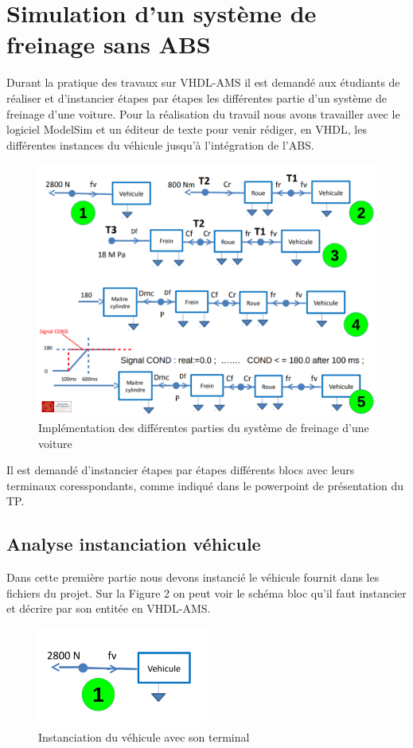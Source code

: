 \section{Simulation d'un système de freinage sans ABS}
Durant la pratique des travaux sur VHDL-AMS il est demandé aux étudiants de réaliser et d'instancier étapes par étapes les différentes partie d'un système de freinage d'une voiture. Pour la réalisation du travail nous avons travailler avec le logiciel ModelSim et un éditeur de texte pour venir rédiger, en VHDL, les différentes instances du véhicule jusqu'à l'intégration de l'ABS.

\begin{figure}[h]
    \centering
    \includegraphics[width=\textwidth]{images/etapes.png}
    \caption{Implémentation des différentes parties du système de freinage d'une voiture}
\end{figure}

Il est demandé d'instancier étapes par étapes différents blocs avec leurs terminaux coresspondants, comme indiqué dans le powerpoint de présentation du TP.

\newpage

\subsection{Analyse instanciation véhicule }
Dans cette première partie nous devons instancié le véhicule fournit dans les fichiers du projet. Sur la Figure 2 on peut voir le schéma bloc qu'il faut instancier et décrire par son entitée en VHDL-AMS.

\begin{figure}[h]
    \centering
    \includegraphics[width=0.5\textwidth]{images/un.png}
    \caption{Instanciation du véhicule avec son terminal}
\end{figure}

